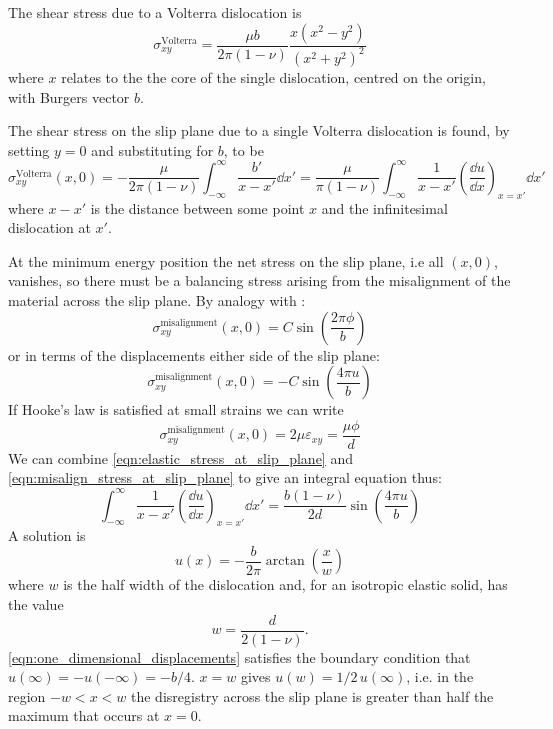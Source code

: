 The shear stress due to a Volterra dislocation  is \cite{hirth_lothe1982peierls_displacements}
\begin{equation}
\sigma^{\text{Volterra}}_{xy} = \frac{\mu b}{2\pi (1-\nu)} \frac{x(x^2 - y^2)}{(x^2+y^2)^2}
\end{equation}
where $x$ relates to the the core of the single dislocation, centred on the origin, with Burgers vector $b$.

The shear stress on the slip plane due to a single Volterra dislocation is found, by setting $y=0$ and substituting for $b$, to be
\begin{equation}
\sigma^{\text{Volterra}}_{xy}(x,0) = -\frac{\mu}{2\pi(1-\nu)} \int^{\infty}_{-\infty} \frac{b'}{x-x'} \!\dd x' =  \frac{\mu}{\pi(1-\nu)} \int^{\infty}_{-\infty} \frac{1}{x-x'} \left(\!\frac{\dd u}{\dd x}\right)_{x=x'} \!\dd x'
\label{eqn:elastic_stress_at_slip_plane}
\end{equation}
where $x-x'$ is the distance between some point $x$ and the infinitesimal dislocation at $x'$.

At the minimum energy position the net stress on the slip plane, i.e all $(x,0)$, vanishes, so there must be a balancing stress arising from the misalignment of the material across the slip plane. By analogy with \citet{Frenkel1926}:
\begin{equation}
\sigma_{xy}^{\text{misalignment}}(x,0) = C \sin \left( \frac{2\pi \phi}{b} \right)
\end{equation}
or in terms of the displacements either side of the slip plane:
\begin{equation}
\sigma_{xy}^{\text{misalignment}}(x,0) = -C \sin \left( \frac{4\pi u}{b} \right)
\end{equation}
If Hooke's law is satisfied at small strains we can write
\begin{equation}
\sigma_{xy}^{\text{misalignment}}(x,0) = 2 \mu \varepsilon_{xy} = \frac{\mu{}\phi}{d}
\label{eqn:misalign_stress_at_slip_plane}
\end{equation}
We can combine \autoref{eqn:elastic_stress_at_slip_plane} and \autoref{eqn:misalign_stress_at_slip_plane} to give an integral equation thus:
\begin{equation}
\int^{\infty}_{-\infty} \frac{1}{x-x'} \left(\!\frac{\dd u}{\dd x}\right)_{x=x'} \dd x' = \frac{b(1-\nu)}{2d} \sin\left(\frac{4\pi{}u}{b}\right)
\end{equation}
A solution is \cite{hirth_lothe1982peierls_displacements, Eshelby1949}
\begin{equation}
u(x) = -\frac{b}{2\pi} \arctan \left( \frac{x}{w} \right)
\label{eqn:one_dimensional_displacements}
\end{equation}
where $w$ is the half width of the dislocation and, for an isotropic elastic solid, has the value
\begin{equation}
w = \frac{d}{2(1-\nu)}.\label{eqn:half_width}
\end{equation}
\autoref{eqn:one_dimensional_displacements} satisfies the boundary condition that $u(\infty) = - u(-\infty) = -b/4$. $x=w$ gives $u(w)=1/2\, u(\infty)$, i.e. in the region $-w < x < w$ the disregistry across the slip plane is greater than half the maximum that occurs at $x=0$.


